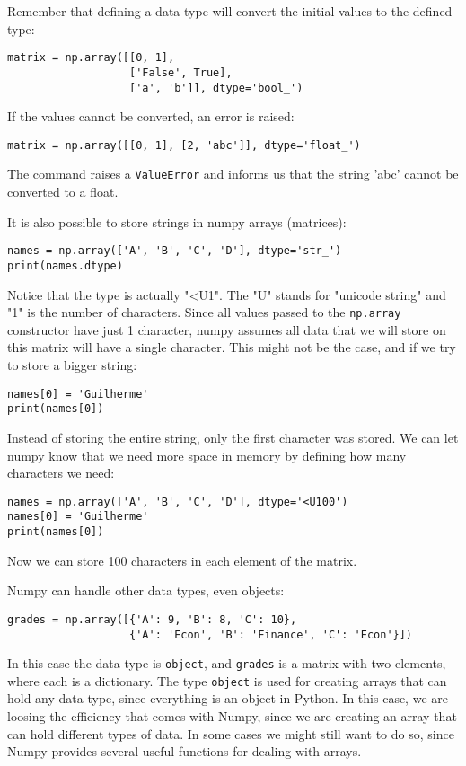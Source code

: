 \documentclass[12pt, a4paper]{article}
\begin{document}
Remember that defining a data type will convert the initial values to the defined type:
\lstset{language=jupyter-python,label= ,caption= ,captionpos=b,numbers=none}
\begin{lstlisting}
matrix = np.array([[0, 1],
                   ['False', True],
                   ['a', 'b']], dtype='bool_')
\end{lstlisting}
If the values cannot be converted, an error is raised:
\lstset{language=jupyter-python,label= ,caption= ,captionpos=b,numbers=none}
\begin{lstlisting}
matrix = np.array([[0, 1], [2, 'abc']], dtype='float_')
\end{lstlisting}
The command raises a \texttt{ValueError} and informs us that the string 'abc' cannot be converted to a float.

It is also possible to store strings in numpy arrays (matrices):
\lstset{language=jupyter-python,label= ,caption= ,captionpos=b,numbers=none}
\begin{lstlisting}
names = np.array(['A', 'B', 'C', 'D'], dtype='str_')
print(names.dtype)
\end{lstlisting}
Notice that the type is actually "<U1". The "U" stands for "unicode string" and "1" is the number of characters.
Since all values passed to the \texttt{np.array} constructor have just 1 character, numpy assumes all data that we will store on this matrix will have a single character.
This might not be the case, and if we try to store a bigger string:
\lstset{language=jupyter-python,label= ,caption= ,captionpos=b,numbers=none}
\begin{lstlisting}
names[0] = 'Guilherme'
print(names[0])
\end{lstlisting}
Instead of storing the entire string, only the first character was stored.
We can let numpy know that we need more space in memory by defining how many characters we need:
\lstset{language=jupyter-python,label= ,caption= ,captionpos=b,numbers=none}
\begin{lstlisting}
names = np.array(['A', 'B', 'C', 'D'], dtype='<U100')
names[0] = 'Guilherme'
print(names[0])
\end{lstlisting}
Now we can store 100 characters in each element of the matrix.

Numpy can handle other data types, even objects:
\lstset{language=jupyter-python,label= ,caption= ,captionpos=b,numbers=none}
\begin{lstlisting}
grades = np.array([{'A': 9, 'B': 8, 'C': 10},
                   {'A': 'Econ', 'B': 'Finance', 'C': 'Econ'}])
\end{lstlisting}
In this case the data type is \texttt{object}, and \texttt{grades} is a matrix with two elements, where each is a dictionary.
The type \texttt{object} is used for creating arrays that can hold any data type, since everything is an object in Python.
In this case, we are loosing the efficiency that comes with Numpy, since we are creating an array that can hold different types of data.
In some cases we might still want to do so, since Numpy provides several useful functions for dealing with arrays.
\end{document}
